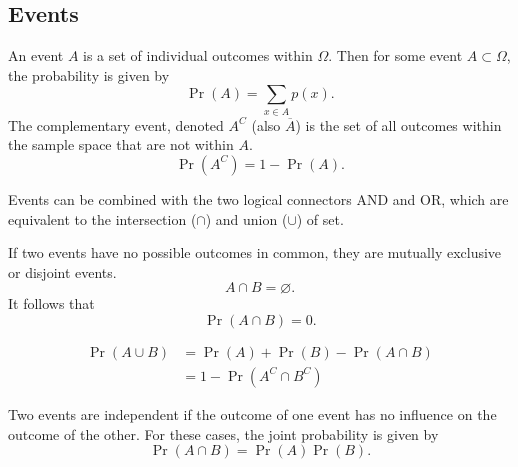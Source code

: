\documentclass{article}
\begin{document}
\subsection{Events}
\begin{definition}[Events]
    An event $A$ is a set of individual outcomes within $\Omega$.
    Then for some event $A\subset\Omega$, the probability is given by
    \begin{equation*}
        \Pr{\left( A \right)} = \sum_{x\in A} p(x).
    \end{equation*}
    The complementary event, denoted $A^C$ (also $\overline{A}$) is the set of all
    outcomes within the sample space that are not within $A$.
    \begin{equation*}
        \Pr{\left( A^C \right)} = 1 - \Pr{\left( A \right)}.
    \end{equation*}
\end{definition}
\begin{definition}
    Events can be combined with the two logical connectors AND and OR, which are
    equivalent to the intersection ($\cap$) and union ($\cup$) of set.
\end{definition}
\begin{definition}
    If two events have no possible outcomes in common, they are mutually exclusive or disjoint events.
    \begin{equation*}
        A \cap B = \varnothing.
    \end{equation*}
    It follows that
    \begin{equation*}
        \Pr{\left( A \cap B \right)} = 0.
    \end{equation*}
\end{definition}
\begin{theorem}
    \begin{align*}
        \Pr{\left( A \cup B \right)} & = \Pr{\left( A \right)} + \Pr{\left( B \right)} - \Pr{\left( A \cap B \right)} \\
                                     & = 1 - \Pr{\left( A^C \cap B^C \right)}
    \end{align*}
\end{theorem}
\begin{definition}
    Two events are independent if the outcome of one event has no influence on the outcome of the other.
    For these cases, the joint probability is given by
    \begin{equation*}
        \Pr{\left( A \cap B \right)} = \Pr{\left( A \right)} \Pr{\left( B \right)}.
    \end{equation*}
\end{definition}
\end{document}
